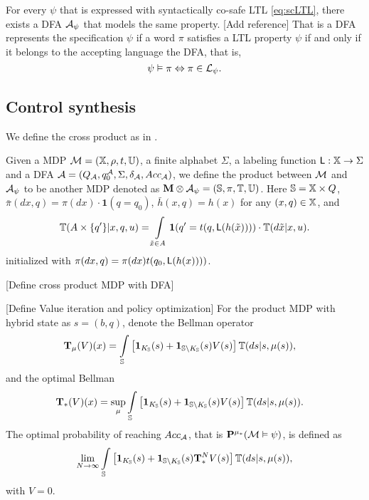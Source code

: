 \documentclass{ifacconf}
\newcommand{\red}[1]{{\color{red} #1}}
\begin{document}
For every $\psi$ that is expressed with syntactically co-safe LTL  \eqref{eq:scLTL}, there exists a DFA  $\mathcal{A}_\psi$ that models the same property. \red{[Add reference]} That is a DFA represents the specification $\psi$ if a word $\pi$ satisfies a LTL property $\psi$ if and only if it belongs to the accepting language the DFA, that is,
	 \[\psi\vDash\pi \Leftrightarrow \pi\in \mathcal{L}_\psi.\]


\subsection{Control synthesis}
We define the cross product as in \cite{tech_report_TACAS}.
\begin{definition}
\label{def:product}
Given a MDP  $\mathcal{M} = ({\mathbb{X}}, \rho, t, {\mathbb{U}})$,
a finite alphabet $\Sigma$,
a labeling function $\mathsf{L}:{\mathbb{X}}\rightarrow\Sigma$
and a DFA  $\mathcal{A} = (Q_{\mathcal{A}}, q_0^{\mathcal{A}}, \Sigma, \delta_{\mathcal{A}}, Acc_{\mathcal{A}})$,
we define the product between $\mathcal{M}$ and $\mathcal{A}_\psi$ to be another MDP denoted as
${\mathbf{M}}\otimes\mathcal A_\psi = (\mathbb S,\relax\pi,\relax{\mathbb T},{\mathbb{U}})$.
Here $\mathbb S= {\mathbb{X}}\times Q$, $\bar\pi(dx,q) = \pi(dx)\cdot \mathbf{1}(q = q_0)$, $\bar h(x,q) = h(x)$ for any $(x,q)\in\relax{{\mathbb{X}}}$, and
\begin{equation*}
  \bar{\mathbb T}(A\times\{q'\}|x,q,u) = \int_{\tilde x\in A}\mathbf{1}(q' = \tr(q,\mathsf L(h(\tilde x))))\cdot\mathbb T(d\tilde  x|x,u).
\end{equation*}
initialized with  $\relax\pi(dx,q) = \pi(dx) t(q_0,\mathsf L(h(x))))$. 
\end{definition}

\red{[Define cross product MDP with DFA]}



\red{[Define Value iteration and policy optimization]}
For the product MDP with hybrid state as $s=(b, q)$, denote the Bellman operator
\begin{align}\label{eq:V_recopt_inf}
& \Bel_\mu (V)(x) =\int_{\S}\left[\mathbf 1_{K_\S}(\bar s)+ \mathbf 1_{\S\setminus K_\S}(\bar s) V(\bar s)\right]\bar{\mathbb{T}}(d\bar s|s,\mu(s)),
\end{align}
and the optimal Bellman 
\begin{align}\label{eq:V_recopt_inf}
& \Bel_\ast (V)(x) =\sup_\mu\int_{\S}\left[\mathbf 1_{K_\S}(\bar s)+ \mathbf 1_{\S\setminus K_\S}(\bar s) V(\bar s)\right]\bar{\mathbb{T}} (d\bar s|s,\mu(s)).
\end{align}
The optimal probability of reaching $Acc_{\mathcal{A}}$, that is $\mathbf{P}^{\mu_\ast}(\mathcal{M}\vDash\psi) $, is defined as
\begin{align}
	\lim_{N\rightarrow \infty}\int_{\S}\left[\mathbf 1_{K_\S}(\bar s)+ \mathbf 1_{\S\setminus K_\S}(\bar s) \Bel^N_\ast V(\bar s)\right]\bar{\mathbb{T}} (d\bar s|s,\mu(s)),
\end{align}
with $V=0$.
\end{document}
